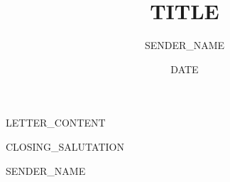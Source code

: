 \documentclass{article}
\title{{{TITLE}}}
\author{{{SENDER_NAME}}}
\date{{{DATE}}}
\begin{document}
%

\maketitle

\bigskip
\noindent
{{LETTER_CONTENT}}

\bigskip
\noindent
{{CLOSING_SALUTATION}}

\bigskip
\noindent
{{SENDER_NAME}}
\end{document}
